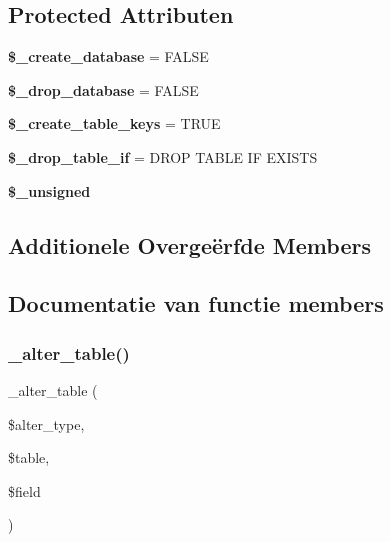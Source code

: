 \subsection*{Protected Attributen}
\begin{DoxyCompactItemize}
\item 
\mbox{\label{class_c_i___d_b__pdo__cubrid__forge_acd23c9a8735806155f1a5d0a87c151f2}} 
{\bfseries \$\+\_\+create\+\_\+database} = F\+A\+L\+SE
\item 
\mbox{\label{class_c_i___d_b__pdo__cubrid__forge_a8305b12fc17f6f87778260ebdff287b4}} 
{\bfseries \$\+\_\+drop\+\_\+database} = F\+A\+L\+SE
\item 
\mbox{\label{class_c_i___d_b__pdo__cubrid__forge_a73e07acdd35c948ad353903c2827af6e}} 
{\bfseries \$\+\_\+create\+\_\+table\+\_\+keys} = T\+R\+UE
\item 
\mbox{\label{class_c_i___d_b__pdo__cubrid__forge_a92a8a9145a7fc91e252e58d019373581}} 
{\bfseries \$\+\_\+drop\+\_\+table\+\_\+if} = \textquotesingle{}D\+R\+OP T\+A\+B\+LE IF E\+X\+I\+S\+TS\textquotesingle{}
\item 
{\bfseries \$\+\_\+unsigned}
\end{DoxyCompactItemize}
\subsection*{Additionele Overge\"{e}rfde Members}


\subsection{Documentatie van functie members}
\mbox{\label{class_c_i___d_b__pdo__cubrid__forge_a41c6cae02f2fda8b429ad0afb9509426}} 
\subsubsection{\texorpdfstring{\_alter\_table()}{\_alter\_table()}}
{\footnotesize\ttfamily \+\_\+alter\+\_\+table (\begin{DoxyParamCaption}\item[{}]{\$alter\+\_\+type,  }\item[{}]{\$table,  }\item[{}]{\$field }\end{DoxyParamCaption})\hspace{0.3cm}{\ttfamily [protected]}}

